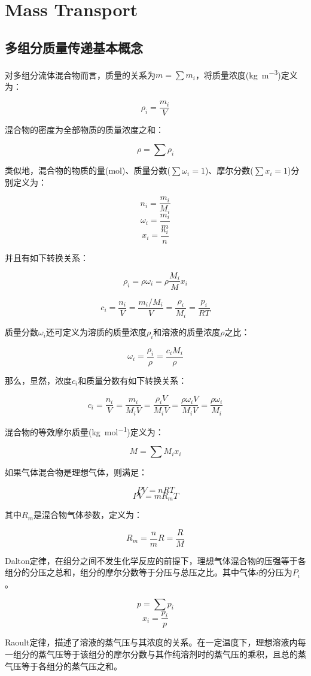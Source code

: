 \chapter{Mass Transport}

\section{多组分质量传递基本概念}

对多组分流体混合物而言，质量的关系为$ m=\sum m_i $，将质量浓度(\si{\kilogram\per\meter\cubed})定义为：

\[\rho_i = \frac{m_i}{V} \]

混合物的密度为全部物质的质量浓度之和：

\[\rho = \sum\rho_i \]

类似地，混合物的物质的量(\si{\mole})、质量分数($ \sum \omega_i = 1 $)、摩尔分数($ \sum x_i = 1 $)分别定义为：

\[ n_i=\frac{m_i}{M_i} \]
\[ \omega_i = \frac{m_i}{m} \]
\[ x_i = \frac{n_i}{n} \]

并且有如下转换关系：

\[\rho_i = \rho\omega_i = \rho\frac{M_i}{M}x_i \]

\[c_i = \frac{n_i}{V} = \frac{m_i/M_i}{V} = \frac{\rho_i}{M_i}  = \frac{p_i}{RT} \]

质量分数$ \omega_i $还可定义为溶质的质量浓度$ \rho_i $和溶液的质量浓度$ \rho $之比：

\[\omega_i = \frac{\rho_i}{\rho} =\frac{c_i M_i}{\rho}\]

那么，显然，浓度$ c_i $和质量分数有如下转换关系：

\[ c_i = \frac{n_i}{V} = \frac{m_i}{M_i V} = \frac{\rho_i V}{M_i V} = \frac{\rho\omega_i V}{M_i V} = \frac{\rho\omega_i}{M_i}\]

混合物的等效摩尔质量(\si{\kilogram\per\mole})定义为：

\[ M = \sum M_i x_i \]

如果气体混合物是理想气体，则满足：

\[ PV=nRT \]
\[ PV=mR_m T \]

其中$ R_m $是混合物气体参数，定义为：

\[ R_m = \frac{n}{m}R = \frac{R}{M} \]

Dalton定律，在组分之间不发生化学反应的前提下，理想气体混合物的压强等于各组分的分压之总和，组分的摩尔分数等于分压与总压之比。其中气体$ i $的分压为$ P_i $。

\[ p=\sum p_i \]
\[x_i = \frac{p_i}{p}\]

Raoult定律，描述了溶液的蒸气压与其浓度的关系。在一定温度下，理想溶液内每一组分的蒸气压等于该组分的摩尔分数与其作纯溶剂时的蒸气压的乘积，且总的蒸气压等于各组分的蒸气压之和。

